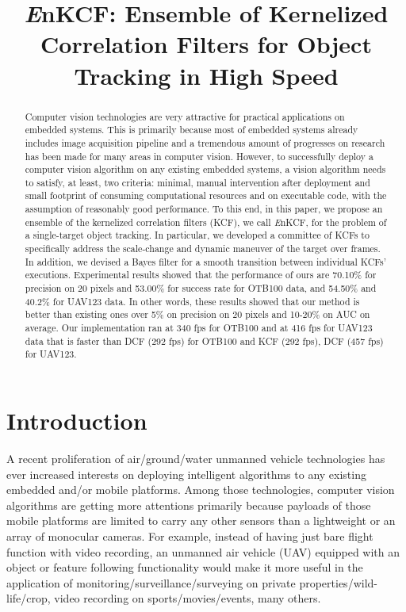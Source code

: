 \documentclass{bmvc2k}
\title{ {\it E}nKCF: Ensemble of Kernelized Correlation Filters for Object Tracking in High Speed}
\begin{document}
\maketitle

\begin{abstract}
Computer vision technologies are very attractive for practical
applications on embedded systems. This is primarily because most of
embedded systems already includes image acquisition pipeline and a
tremendous amount of progresses on research has been made for many
areas in computer vision. However, to successfully deploy a computer
vision algorithm on any existing embedded systems, a vision algorithm
needs to satisfy, at least, two criteria: minimal, manual intervention
after deployment and small footprint of consuming computational
resources and on executable code, with the assumption of reasonably
good performance. To this end, in this paper, we propose an ensemble
of the kernelized correlation filters (KCF), we call {\it E}nKCF, for
the problem of a single-target object tracking. In particular, we
developed a committee of KCFs to specifically address the scale-change
and dynamic maneuver of the target over frames. In addition, we
devised a Bayes filter for a smooth transition between individual
KCFs' executions. Experimental results showed that the performance of
ours are 70.10\% for precision on 20 pixels and 53.00\% for success
rate for OTB100 data, and 54.50\% and 40.2\% for UAV123 data. In other
words, these results showed that our method is better than existing
ones over 5\% on precision on 20 pixels and 10-20\% on AUC on
average. Our implementation ran at 340 fps for OTB100 and at 416 fps
for UAV123 data that is faster than DCF (292 fps) for OTB100 and KCF
(292 fps), DCF (457 fps) for UAV123.
\end{abstract}

\section{Introduction}
A recent proliferation of air/ground/water unmanned vehicle
technologies has ever increased interests on deploying intelligent
algorithms to any existing embedded and/or mobile platforms. Among
those technologies, computer vision algorithms are getting more
attentions primarily because payloads of those mobile platforms are
limited to carry any other sensors than a lightweight or an array of
monocular cameras. For example, instead of having just bare flight
function with video recording, an unmanned air vehicle (UAV) equipped
with an object or feature following functionality would make it more
useful in the application of monitoring/surveillance/surveying on
private properties/wild-life/crop, video recording on
sports/movies/events, many others.
\end{document}
